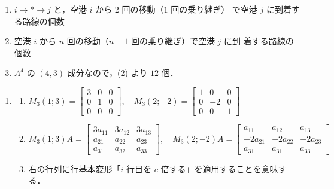 \documentclass[11pt, uplatex, dvipdfmx]{jsarticle}
\begin{document}
\begin{enumerate}
\begin{enumerate}[(1)]
  \item $i \to \ast \to j$ と，空港 $i$ から $2$ 回の移動（$1$ 回の乗り継ぎ）
    で空港 $j$ に到着する路線の個数

  \item 空港 $i$ から $n$ 回の移動（$n-1$ 回の乗り継ぎ）で空港 $j$ に到
    着する路線の個数

  \item $A^4$ の $(4,3)$ 成分なので，(2) より $12$ 個．
  \end{enumerate}
\end{enumerate}

\vspace{1zh}

\begin{enumerate}
  \setlength{\itemsep}{1zh}
  
\item
  \begin{enumerate}[(1)]
    \setlength{\itemsep}{1ex}
    
  \item $M_3(1;3)=\left[
      \begin{array}{ccc}
        3 & 0 & 0\\
        0 & 1 & 0\\
        0 & 0 & 0
      \end{array}
    \right], \quad M_3(2;-2)=\left[
      \begin{array}{rrr}
        1 & 0 & 0\\
        0 & -2 & 0\\
        0 & 0 & 1
      \end{array}
    \right]$

  \item $M_3(1;3)A=\left[
      \begin{array}{rrr}
        3a_{11} & 3 a_{12} & 3 a_{13}\\
        a_{21} & a_{22} & a_{23}\\
        a_{31} & a_{32} & a_{33}
      \end{array}
    \right], \quad M_3(2;-2)A=\left[
      \begin{array}{rrr}
        a_{11} & a_{12} & a_{13}\\
        -2a_{21} & -2a_{22} & -2a_{23}\\
        a_{31} & a_{31} & a_{33}
      \end{array}
    \right]$

  \item 右の行列に行基本変形「$i$ 行目を $c$ 倍する」を適用することを意味する．
  \end{enumerate}


\end{enumerate}
\end{document}

